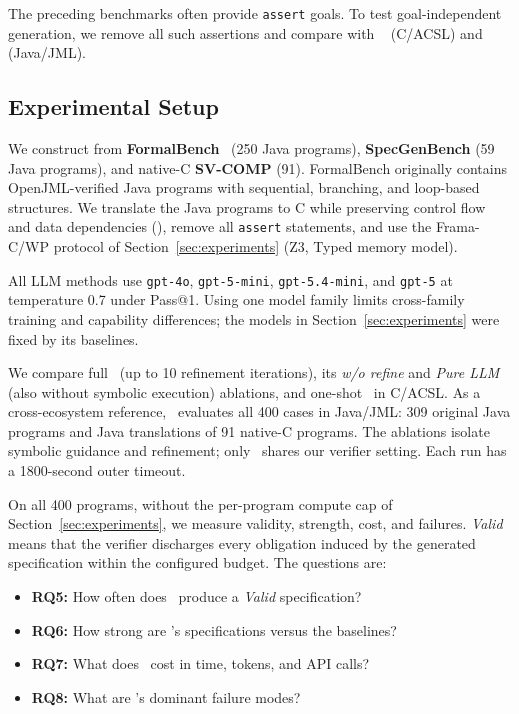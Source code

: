 \label{sec:large-scale-experiment}
The preceding benchmarks often provide \texttt{assert} goals. To test
goal-independent generation, we remove all such assertions and compare with
\autospec~\cite{autospec} (C/ACSL) and \specgen~\cite{SpecGen} (Java/JML).

\subsection{Experimental Setup}
We construct \textbf{} from \textbf{FormalBench}~\cite{le2025can}
(250 Java programs), \textbf{SpecGenBench} (59 Java programs), and native-C
\textbf{SV-COMP} (91). FormalBench originally contains OpenJML-verified Java
programs with sequential, branching, and loop-based structures. We translate
the Java programs to C while preserving
control flow and data dependencies {()},
remove all \texttt{assert} statements, and use the Frama-C/WP protocol of
Section~\ref{sec:experiments} (Z3, Typed memory model).

All LLM methods use \texttt{gpt-4o}, \texttt{gpt-5-mini},
\texttt{gpt-5.4-mini}, and \texttt{gpt-5} at temperature 0.7 under Pass@1.
Using one model family limits cross-family training and capability differences;
the models in Section~\ref{sec:experiments} were fixed by its baselines.

We compare full \toolname\ (up to 10 refinement iterations), its \emph{w/o
refine} and \emph{Pure LLM} (also without symbolic execution) ablations, and
one-shot \autospec\ in C/ACSL. {As a cross-ecosystem reference, \specgen\ evaluates all 400 cases in Java/JML: 309 original Java programs and Java translations of 91 native-C programs.} The ablations isolate symbolic
guidance and refinement; only \autospec\ shares our verifier setting. Each
run has a 1800-second outer timeout.

On all 400 programs, without the per-program compute cap of
Section~\ref{sec:experiments}, we measure validity, strength, cost, and failures.
\emph{Valid} means that the verifier discharges every obligation induced by the
generated specification within the configured budget. The questions are:
\begin{itemize}
    \item \textbf{RQ5:} How often does \toolname\ produce a
    \emph{Valid} specification?
    \item \textbf{RQ6:} How strong are \toolname's specifications
    versus the baselines?
    \item \textbf{RQ7:} What does \toolname\ cost in time, tokens, and
    API calls?
    \item \textbf{RQ8:} What are \toolname's dominant failure modes?
\end{itemize}

